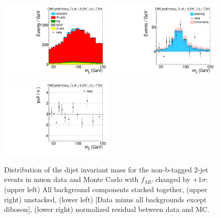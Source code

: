 \begin{figure}[h!]
  {\centering
    \includegraphics[width=0.49\textwidth]{figs/ScaleAndMatchingCrossChecks/mu2JNoBTag_fSUDeffMUp1sigma/Wjj_Diboson_Muon_2jets_Stacked.pdf}
    \includegraphics[width=0.49\textwidth]{figs/ScaleAndMatchingCrossChecks/mu2JNoBTag_fSUDeffMUp1sigma/Wjj_Diboson_Muon_2jets_Subtracted.pdf}
    \includegraphics[width=0.49\textwidth]{figs/ScaleAndMatchingCrossChecks/mu2JNoBTag_fSUDeffMUp1sigma/Wjj_Diboson_Muon_2jets_Pull.pdf}
    \caption{Distribution of the dijet invariant mass for the non-b-tagged 2-jet events in muon data and Monte Carlo with $f_{MU}$ changed by $+1\sigma$: 
      (upper left) All background components stacked together, 
      (upper right) unstacked, (lower left) [Data minus all backgrounds except diboson],  
      (lower right) normalized residual between data and MC. }
    \label{fig:fsufmuXcheck_fSUDeffMUp1sigma}}
\end{figure}
